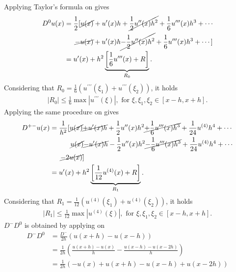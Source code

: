 Applying Taylor's formula on  gives
\begin{align}
	\nonumber
	D^0 u(x) &= \frac{1}{2} [\cancel{u(x)} + u^\prime(x)h + \cancel{\frac{1}{2} u^{\prime \prime}(x)h^2} + \frac{1}{6}u^{\prime \prime \prime}(x)h^3 + \cdots \\
			 \nonumber
			 &\quad\;\; \cancel{-u(x)} + u^\prime(x)h \cancel{-\frac{1}{2} u^{\prime \prime}(x)h^2} + \frac{1}{6}u^{\prime \prime \prime}(x)h^3 + \cdots ]		\\
			 &=	u^\prime(x) + h^2\underbrace{\left[\frac{1}{6}u^{\prime \prime \prime}(x) + R \right]}_{R_0}\text{.}
\end{align}
Considering that $R_0 = \frac{1}{6} \left(u^{\prime \prime \prime}(\xi_1) + u^{\prime \prime \prime}(\xi_2) \right)$, it holds
\begin{align}
	\left|R_0\right| \leq \frac{1}{6} \max{\left|u^{\prime \prime \prime}(\xi)\right|}, \text{ for } \xi, \xi_1, \xi_2 \in [x-h, x+h] \text{.}
\end{align}
%
Applying the same procedure on  gives
\begin{align}
	\nonumber
	D^{+-} u(x) &= \frac{1}{h^2} [\cancel{u(x)} \cancel{+u^\prime(x)h} + \frac{1}{2} u^{\prime \prime}(x)h^2 \cancel{+ \frac{1}{6}u^{\prime \prime \prime}(x)h^3} + \frac{1}{24} u^{(4)}h^4+ \cdots \\
			 \nonumber
				&\qquad\quad\cancel{u(x)} \cancel{-u^\prime(x)h} - \frac{1}{2} u^{\prime \prime}(x)h^2 \cancel{-\frac{1}{6}u^{\prime \prime \prime}(x)h^3} + \frac{1}{24} u^{(4)}h^4+ \cdots\\
			\nonumber
				&\quad\;\; \cancel{-2u(x)}]\\
				&=	u^\prime(x) + h^2\underbrace{\left[\frac{1}{12}u^{(4)}(x) + R \right]}_{R_1}\text{.}
\end{align}
Considering that $R_1 = \frac{1}{12} \left(u^{(4)}(\xi_1) + u^{(4)}(\xi_2) \right)$, it holds
\begin{align}
	\left|R_1\right| \leq \frac{1}{12} \max{\left|u^{(4)}(\xi)\right|}, \text{ for } \xi, \xi_1, \xi_2 \in [x-h, x+h] \text{.}
\end{align}
$D^-D^0$ is obtained by applying  on 
\begin{align}
	\nonumber
	D^-D^0 &= \frac{D^-}{2h}\left(u(x+h) - u(x-h)\right) \\
	\nonumber
		   &= \frac{1}{2h} \left( \frac{u(x+h) - u(x)}{h} - \frac{u(x-h) - u(x-2h)}{h}\right)\\
		   &= \frac{1}{2h} \left( -u(x) + u(x+h) -u(x-h)+u(x-2h)\right)
\end{align}
